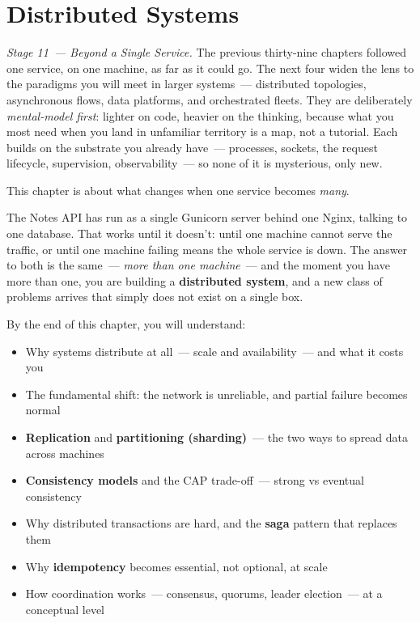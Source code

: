 \setcounter{chapter}{39}
\chapter{Distributed Systems}\label{ch:40-distributed-systems}

\chapterrule

\emph{Stage 11~--- Beyond a Single Service.} The previous thirty-nine chapters followed one service, on one machine, as far as it could go. The next four widen the lens to the paradigms you will meet in larger systems~--- distributed topologies, asynchronous flows, data platforms, and orchestrated fleets. They are deliberately \emph{mental-model first}: lighter on code, heavier on the thinking, because what you most need when you land in unfamiliar territory is a map, not a tutorial. Each builds on the substrate you already have~--- processes, sockets, the request lifecycle, supervision, observability~--- so none of it is mysterious, only new.

This chapter is about what changes when one service becomes \emph{many}.

The Notes API has run as a single Gunicorn server behind one Nginx, talking to one database. That works until it doesn't: until one machine cannot serve the traffic, or until one machine failing means the whole service is down. The answer to both is the same~--- \emph{more than one machine}~--- and the moment you have more than one, you are building a \textbf{distributed system}, and a new class of problems arrives that simply does not exist on a single box.

\begin{objectives}

By the end of this chapter, you will understand:

\begin{itemize}
\tightlist
\item
  Why systems distribute at all~--- scale and availability~--- and what it costs you
\item
  The fundamental shift: the network is unreliable, and partial failure becomes normal
\item
  \textbf{Replication} and \textbf{partitioning (sharding)}~--- the two ways to spread data across machines
\item
  \textbf{Consistency models} and the CAP trade-off~--- strong vs eventual consistency
\item
  Why distributed transactions are hard, and the \textbf{saga} pattern that replaces them
\item
  Why \textbf{idempotency} becomes essential, not optional, at scale
\item
  How coordination works~--- consensus, quorums, leader election~--- at a conceptual level
\end{itemize}

\end{objectives}

